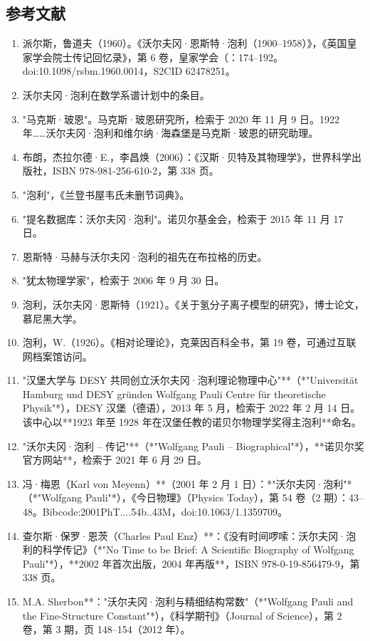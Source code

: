 \subsection{参考文献} 
\begin{enumerate}
\item 派尔斯，鲁道夫（1960）。《沃尔夫冈·恩斯特·泡利（1900–1958）》，《英国皇家学会院士传记回忆录》，第 6 卷，皇家学会（：174–192。doi:10.1098/rsbm.1960.0014，S2CID 62478251。  
\item 沃尔夫冈·泡利在数学系谱计划中的条目。  
\item "马克斯·玻恩"。马克斯·玻恩研究所，检索于 2020 年 11 月 9 日。1922 年……沃尔夫冈·泡利和维尔纳·海森堡是马克斯·玻恩的研究助理。  
\item 布朗，杰拉尔德·E.，李昌焕（2006）：《汉斯·贝特及其物理学》，世界科学出版社，ISBN 978-981-256-610-2，第 338 页。  
\item "泡利"，《兰登书屋韦氏未删节词典》。  
\item "提名数据库：沃尔夫冈·泡利"。诺贝尔基金会，检索于 2015 年 11 月 17 日。  
\item 恩斯特·马赫与沃尔夫冈·泡利的祖先在布拉格的历史。  
\item "犹太物理学家"，检索于 2006 年 9 月 30 日。  
\item 泡利，沃尔夫冈·恩斯特（1921）。《关于氢分子离子模型的研究》，博士论文，慕尼黑大学。  
\item 泡利，W.（1926）。《相对论理论》，克莱因百科全书，第 19 卷，可通过互联网档案馆访问。
\item "汉堡大学与 DESY 共同创立沃尔夫冈·泡利理论物理中心"**（*"Universität Hamburg und DESY gründen Wolfgang Pauli Centre für theoretische Physik"*），DESY 汉堡（德语），2013 年 5 月，检索于 2022 年 2 月 14 日。该中心以**1923 年至 1928 年在汉堡任教的诺贝尔物理学奖得主泡利**命名。  
\item "沃尔夫冈·泡利 – 传记"**（*"Wolfgang Pauli – Biographical"*），**诺贝尔奖官方网站**，检索于 2021 年 6 月 29 日。  
\item 冯·梅恩（Karl von Meyenn）**（2001 年 2 月 1 日）：*"沃尔夫冈·泡利"*（*"Wolfgang Pauli"*），《今日物理》（Physics Today），第 54 卷（2 期）：43–48。Bibcode:2001PhT....54b..43M，doi:10.1063/1.1359709。  
\item 查尔斯·保罗·恩茨（Charles Paul Enz）**：《没有时间啰嗦：沃尔夫冈·泡利的科学传记》（*"No Time to be Brief: A Scientific Biography of Wolfgang Pauli"*），**2002 年首次出版，2004 年再版**，ISBN 978-0-19-856479-9，第 338 页。  
\item M.A. Sherbon**："沃尔夫冈·泡利与精细结构常数"（*"Wolfgang Pauli and the Fine-Structure Constant"*），《科学期刊》（Journal of Science），第 2 卷，第 3 期，页 148–154（2012 年）。  

\end{enumerate}
